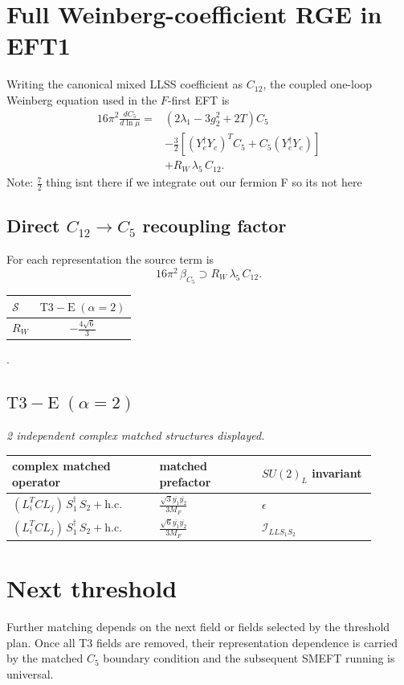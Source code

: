 \documentclass[9pt]{article}
\begin{document}
\section*{Full Weinberg-coefficient RGE in EFT1}
Writing the canonical mixed LLSS coefficient as $C_{12}$, the coupled one-loop Weinberg equation used in the $F$-first EFT is
\begin{align}
16\pi^2\frac{dC_5}{d\ln\mu}={}&(2\lambda_1-3g_2^2+2T)C_5\\
&-\frac32\left[(Y_e^\dagger Y_e)^T C_5+C_5(Y_e^\dagger Y_e)\right]\\
&+R_W\,\lambda_5\,C_{12}.
\end{align}
Note: $\frac{7}{2}$ thing isnt there if we integrate out our fermion F so its not here \subsection*{Direct $C_{12}\to C_5$ recoupling factor}
For each representation the source term is
\[16\pi^2\,\beta_{C_5}\supset R_W\,\lambda_5\,C_{12}.\]
\begin{longtable}{@{}lc@{}}
\toprule
$\mathcal{S}$ & $ \mathrm{T3-E}\;(\alpha=2) $ \\
\midrule
$R_W$ & $ - \frac{4 \sqrt{6}}{3} $ \\
\bottomrule
\end{longtable}
.
\subsection*{$ \mathrm{T3-E}\;(\alpha=2) $}
\textit{2 independent complex matched structures displayed. }
\begin{longtable}{@{}p{0.36\linewidth}p{0.25\linewidth}p{0.29\linewidth}@{}}
\toprule
complex matched operator & matched prefactor & $SU(2)_L$ invariant \\
\midrule
$ (L_i^T C L_j)\,S_1^\dagger\,S_2+\mathrm{h.c.} $ & $ \frac{\sqrt{3} \overline{y_{1}} \overline{y_{2}}}{3 M_F} $ & $ \epsilon $ \\
$ (L_i^T C L_j)\,S_1^\dagger\,S_2+\mathrm{h.c.} $ & $ \frac{\sqrt{6} \overline{y_{1}} \overline{y_{2}}}{3 M_F} $ & $ \mathcal{I}_{LLS_1S_2} $ \\
\bottomrule
\end{longtable}
\section*{Next threshold}
Further matching depends on the next field or fields selected by the threshold plan.  Once all T3 fields are removed, their representation dependence is carried by the matched $C_5$ boundary condition and the subsequent SMEFT running is universal.
\end{document}
